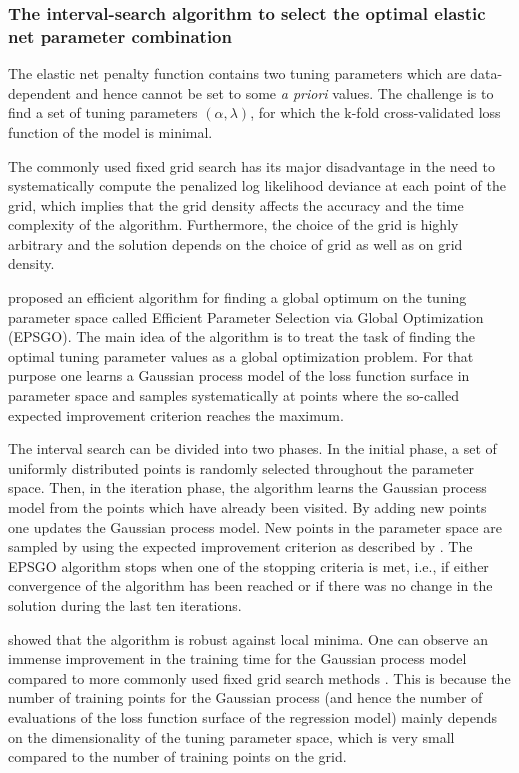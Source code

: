 \documentclass[]{jss}
\begin{document}
\subsubsection{The interval-search algorithm to select the optimal elastic net parameter combination}
The elastic net penalty function contains two tuning parameters which are data-dependent and hence cannot be set to some \emph{a priori} values. The challenge is to find a set of tuning parameters $\left(\alpha,\lambda\right)$, for which the k-fold cross-validated loss function of the model is minimal.

The commonly used fixed grid search has its major disadvantage in the need to systematically compute the penalized log likelihood deviance at each point of the grid, which implies that the grid density affects the accuracy and the time complexity of the algorithm. Furthermore, the choice of the grid is highly arbitrary and the solution depends on the choice of grid as well as on grid density. 

 proposed an efficient algorithm for finding a global optimum on the tuning parameter space 
called Efficient Parameter Selection via Global Optimization (EPSGO). The main idea of the algorithm is to treat the task of finding the optimal tuning parameter values as a global optimization problem. For that purpose one learns a Gaussian process model of the loss function surface in parameter space and samples systematically at points where the so-called expected improvement criterion reaches the maximum. 

The interval search can be divided into two phases. In the initial phase, a set of uniformly distributed points is randomly selected throughout the parameter space. Then, in the iteration phase, the algorithm learns the Gaussian process model from the points which have already been visited. By adding new points one updates the Gaussian process model.
New points in the parameter space are sampled by using the expected improvement criterion as described by \citet{Jones1998}. The EPSGO algorithm stops when one of the stopping criteria is met, i.e., if either convergence of the algorithm has been reached or if there was no change in the solution during the last ten iterations.

 showed that the algorithm is robust against local minima. 
One can observe an immense improvement in the training time for the Gaussian process model compared to more commonly used fixed grid search methods \citep{froehlich2005}. This is because the number of training points for the Gaussian process (and hence the number of evaluations of the loss function surface of the regression model) mainly depends on the dimensionality of the tuning parameter space, which is very small compared to the number of training points on the grid.
\end{document}
